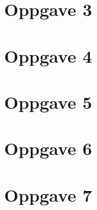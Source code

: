 \documentclass{article}
\begin{document}
    \section{Oppgave 3}

    \section{Oppgave 4}

    \section{Oppgave 5}

    \section{Oppgave 6}

    \section{Oppgave 7}

    
   

    

        

        
\end{document}
